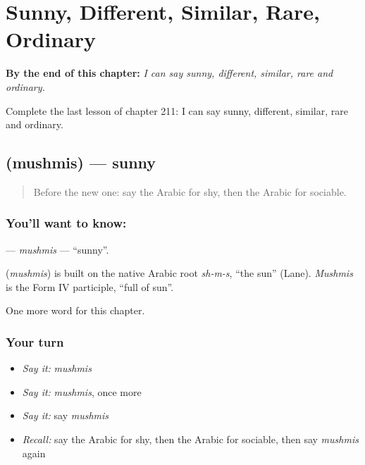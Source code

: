 
\chapter{Sunny, Different, Similar, Rare, Ordinary}
\label{ch:ar-sunny-different-similar-rare-ordinary}

\begin{chapteropening}
\textbf{By the end of this chapter:} \emph{I can say sunny, different, similar, rare and ordinary.}

Complete the last lesson of chapter 211: I can say sunny, different, similar, rare and ordinary.
\end{chapteropening}

\section[\texorpdfstring{\ar{مشمس} (mushmis)}{مشمس (mushmis)}]{ (mushmis) — sunny}

\label{lesson:AR-C211-mushmis}



\begin{quote}
Before the new one: say the Arabic for shy, then the Arabic for sociable.
\end{quote}

\subsection*{You'll want to know: }
\textbf{} — \emph{mushmis} — \textquotedblleft{}sunny\textquotedblright{}.

\begin{cousinweb}
\textbf{} (\emph{mushmis}) is built on the native Arabic root \emph{sh-m-s}, \textquotedblleft{}the sun\textquotedblright{} (Lane). \emph{Mushmis} is the Form IV participle, \textquotedblleft{}full of sun\textquotedblright{}.
\end{cousinweb}

\begin{grammarlens}[title={What you've built}]
One more word for this chapter.
\end{grammarlens}

\subsection*{Your turn}
\begin{itemize}
\raggedright
  \item \emph{Say it:} \emph{mushmis}
  \item \emph{Say it:} \emph{mushmis}, once more
  \item \emph{Say it:} say \emph{mushmis}
  \item \emph{Recall:} say the Arabic for shy, then the Arabic for sociable, then say \emph{mushmis} again
\end{itemize}

